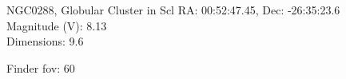 \begin{block}{NGC0288, Globular Cluster in Scl}
    RA: 00:52:47.45, Dec: -26:35:23.6 \\ 
    Magnitude (V): 8.13 \\ 
    Dimensions: 9.6 

    Finder fov: 60 
\end{block}